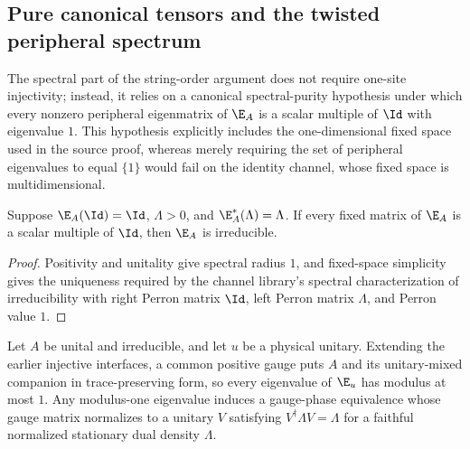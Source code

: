 \subsection{Pure canonical tensors and the twisted peripheral spectrum}

The spectral part of the string-order argument does not require one-site
injectivity; instead, it relies on a canonical spectral-purity hypothesis under
which every nonzero peripheral eigenmatrix of $\E_A$ is a scalar multiple of
$\Id$ with eigenvalue $1$.  This hypothesis explicitly includes the
one-dimensional fixed space used in the source proof, whereas merely requiring
the set of peripheral eigenvalues to equal $\{1\}$ would fail on the identity
channel, whose fixed space is multidimensional.

\begin{lemma}
    \label{lem:canonical_fixed_space_irreducible}
    \leanok
    Suppose $\E_A(\Id)=\Id$, $\Lambda>0$, and
    $\E_A^*(\Lambda)=\Lambda$.  If every fixed matrix of $\E_A$ is a
    scalar multiple of $\Id$, then $\E_A$ is irreducible.
\end{lemma}

\begin{proof}
    Positivity and unitality give spectral radius $1$, and fixed-space
    simplicity gives the uniqueness required by the channel library's
    spectral characterization of irreducibility with right Perron matrix
    $\Id$, left Perron matrix $\Lambda$, and Perron value $1$.
\end{proof}

\begin{lemma}
    \label{lem:irreducible_twisted_transfer_reduction}
    \leanok
    Let $A$ be unital and irreducible, and let $u$ be a physical unitary.
    Extending the earlier injective interfaces, a common positive gauge puts
    $A$ and its unitary-mixed companion in trace-preserving form, so every
    eigenvalue of $\E_u$ has modulus at most $1$.  Any modulus-one eigenvalue
    induces a gauge-phase equivalence whose gauge matrix normalizes to a
    unitary $V$ satisfying $V^\dagger\Lambda V=\Lambda$ for a faithful
    normalized stationary dual density $\Lambda$.
\end{lemma}

